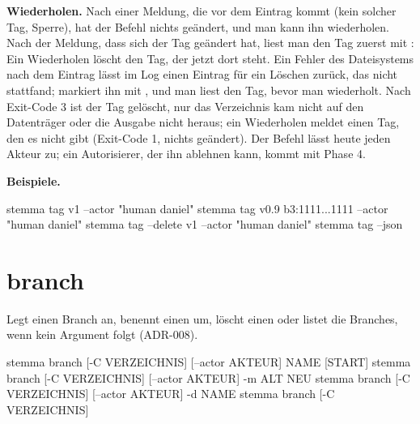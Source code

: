 {\bf Wiederholen.} Nach einer Meldung, die vor dem Eintrag kommt (kein solcher Tag, Sperre),
hat der Befehl nichts geändert, und man kann ihn wiederholen. Nach der Meldung, dass sich der
Tag geändert hat, liest man den Tag zuerst mit : Ein Wiederholen löscht den Tag,
der jetzt dort steht. Ein Fehler des Dateisystems nach dem Eintrag lässt im Log einen Eintrag für
ein Löschen zurück, das nicht stattfand;  markiert ihn mit \type{!}, und man liest
den Tag, bevor man wiederholt. Nach Exit-Code 3 ist der Tag gelöscht, nur das Verzeichnis kam
nicht auf den Datenträger oder die Ausgabe nicht heraus; ein Wiederholen meldet einen Tag, den es
nicht gibt (Exit-Code 1, nichts geändert). Der Befehl lässt heute jeden Akteur zu; ein
Autorisierer, der ihn ablehnen kann, kommt mit Phase 4.

{\bf Beispiele.}

\starttyping
stemma tag v1 --actor "human daniel"
stemma tag v0.9 b3:1111...1111 --actor "human daniel"
stemma tag --delete v1 --actor "human daniel"
stemma tag --json
\stoptyping

\section{branch}

Legt einen Branch an, benennt einen um, löscht einen oder listet die Branches, wenn kein Argument
folgt (ADR-008).

\starttyping
stemma branch [-C VERZEICHNIS] [--actor AKTEUR] NAME [START]
stemma branch [-C VERZEICHNIS] [--actor AKTEUR] -m ALT NEU
stemma branch [-C VERZEICHNIS] [--actor AKTEUR] -d NAME
stemma branch [-C VERZEICHNIS]
\stoptyping

